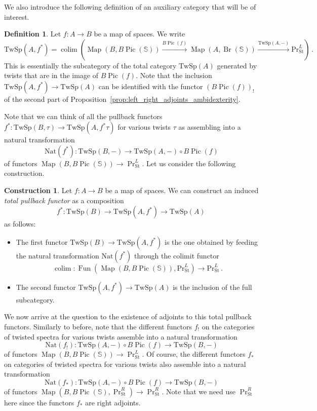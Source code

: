 \documentclass[10pt]{amsart}
\newcommand{\longto}{\longrightarrow}
\theoremstyle{plain}
\theoremstyle{definition}
\newtheorem{definition}[theorem]{Definition}
\newtheorem{construction}[theorem]{Construction}
\DeclareMathOperator*{\colim}{colim}
\DeclareMathOperator{\Fun}{Fun}
\DeclareMathOperator{\Pic}{Pic}
\DeclareMathOperator{\Br}{Br}
\DeclareMathOperator{\Map}{Map}
\newcommand{\St}{\mathrm{St}}
\newcommand{\bS}{\mathbb{S}}
\newcommand{\TwSp}{\mathrm{TwSp}}
\begin{document}
We also introduce the following definition of an auxiliary category that will be of interest.

\begin{definition}
  Let $f : A \to B$ be a map of spaces. We write
  \[
  \TwSp(A,f^*) = \colim\left(\Map(B,B\Pic(\bS)) \overset{B\Pic(f)}\longto \Map(A,\Br(\bS)) \overset{\TwSp(A,-)}\longto \mathrm{Pr}^{L}_{\St} \right)\,.
  \]
  This is essentially the subcategory of the total category $\TwSp(A)$ generated by twists that are in the image of $B\Pic(f)$.
  Note that the inclusion $\TwSp(A,f^*) \to \TwSp(A)$ can be identified with the functor $(B\Pic(f))_!$ of the second part of Proposition~\ref{prop:left_right_adjoints_ambidexterity}.
\end{definition}

Note that we can think of all the pullback functors $f^* : \TwSp(B,\tau) \to \TwSp(A,f^* \tau)$ for various twists $\tau$ as assembling into a natural transformation
\[
\mathrm{Nat}(f^*) : \TwSp(B,-) \longto \TwSp(A,-) \circ B\Pic(f)
\]
of functors $\Map(B,B\Pic(\bS)) \to \Pr^{L}_{\St}$. Let us consider the following construction.

\begin{construction}
Let $f : A \to B$ be a map of spaces. We can construct an induced \emph{total pullback functor} as a composition
\[
f^* : \TwSp(B) \longto  \TwSp(A,f^*) \longto \TwSp(A) \,
\]
as follows:
\begin{itemize}
  \item The first functor $\TwSp(B) \to \TwSp(A,f^*)$ is the one obtained by feeding the natural transformation $\mathrm{Nat}(f^*)$ through the colimit functor
  \[
  \colim : \Fun(\Map(B,B\Pic(\bS)),\mathrm{Pr}^{L}_{\St}) \longto \mathrm{Pr}^{L}_{\St} \,.
  \]
  \item The second functor $\TwSp(A,f^*) \to \TwSp(A)$ is the inclusion of the full subcategory.
\end{itemize}
\end{construction}

We now arrive at the question to the existence of adjoints to this total pullback functors. Similarly to before, note that the different functors $f_!$ on the categories of twisted spectra for various twists assemble into a natural transformation
\[
\mathrm{Nat}(f_!) : \TwSp(A,-) \circ B\Pic(f) \longto \TwSp(B,-)
\]
of functors $\Map(B,B\Pic(\bS)) \to \Pr^{L}_{\St}$. Of course, the different functors $f_*$ on categories of twisted spectra for various twists also assemble into a natural transformation
\[
\mathrm{Nat}(f_*) : \TwSp(A,-) \circ B\Pic(f) \longto \TwSp(B,-)
\]
of functors $\Map(B,B\Pic(\bS),\Pr^{R}_{\St}) \to \Pr^{R}_{\St}$.
Note that we need use $\Pr^{R}_{\St}$ here since the functors $f_*$ are right adjoints.
\end{document}
